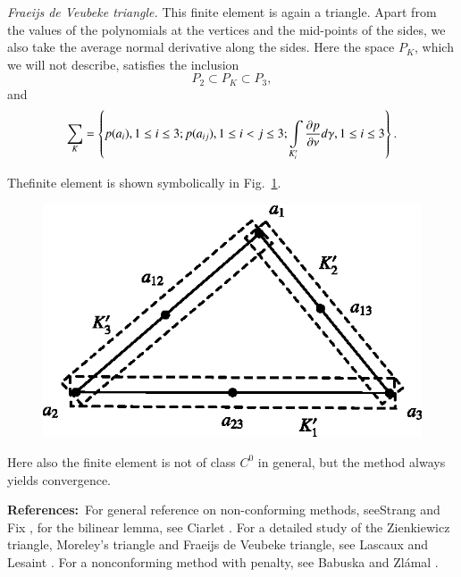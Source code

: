 \begin{example}\label{chap11-exam11.4}
{\em Fraeijs de Veubeke triangle.} This finite element is again a
triangle. Apart from the values of the polynomials at the vertices and
the mid-points of the sides, we also take the average normal
derivative along the sides. Here the space $P_{K}$, which we will not
describe, satisfies the inclusion
$$
P_{2}\subset P_{K}\subset P_{3},
$$
and
$$
\sum_{K}=\left\{p(a_{i}),1\leq i\leq 3; p(a_{ij}), 1\leq i<j\leq 3;
\int\limits_{K'_{i}}\frac{\partial p}{\partial \nu}d\gamma, 1\leq i\leq 3\right\}.
$$

The\pageoriginale finite element is shown symbolically in
Fig.~\ref{chap11-fig11.8}. 
\begin{figure}[H]
\centering
\includegraphics{figure/fig11.8.eps}
\caption{}\label{chap11-fig11.8}
\end{figure}

Here also the finite element is not of class $C^{0}$ in general, but
the method always yields convergence.
\end{example}

\noindent
{\bf References:}~For general reference on non-conforming methods, see\break Strang and Fix \cite{key22}, for the bilinear lemma, see Ciarlet
\cite{key29}. For a detailed study of the Zienkiewicz triangle,
Moreley's triangle and Fraeijs de Veubeke triangle, see Lascaux and
Lesaint \cite{key15}. For a nonconforming method with penalty, see
Babuska and Zl\'amal \cite{key26}.

